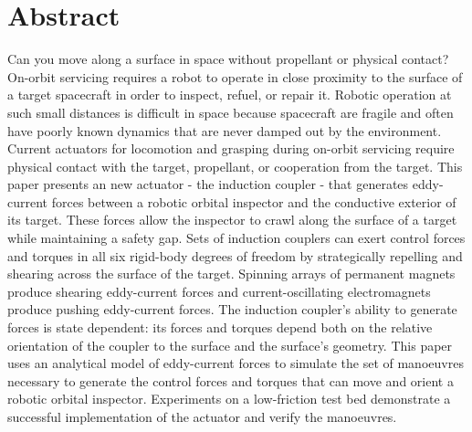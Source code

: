 \documentclass[10pt]{article}
\begin{document}
\listoftodos
{}
\section{Abstract}
Can you move along a surface in space without propellant or physical contact? On-orbit servicing requires a robot to operate in close proximity to the surface of a target spacecraft in order to inspect, refuel, or repair it.  Robotic operation at such small distances is difficult in space because spacecraft are fragile and often have poorly known dynamics that are never damped out by the environment. Current actuators for locomotion and grasping during on-orbit servicing require physical contact with the target, propellant, or cooperation from the target.  
%
This paper presents an new actuator - the induction coupler - that generates eddy-current forces between a robotic orbital inspector and the conductive exterior of its target. These forces allow the inspector to crawl along the surface of a target while maintaining a safety gap. Sets of induction couplers can exert control forces and torques in all six rigid-body degrees of freedom by strategically repelling and shearing across the surface of the target. Spinning arrays of permanent magnets produce shearing eddy-current forces and current-oscillating electromagnets produce pushing eddy-current forces. 
%
The induction coupler's ability to generate forces is state dependent: its forces and torques depend both on the relative orientation of the coupler to the surface and the surface's geometry. This paper uses an analytical model of eddy-current forces to simulate the set of manoeuvres necessary to generate the control forces and torques that can move and orient a robotic orbital inspector. Experiments on a low-friction test bed demonstrate a successful implementation of the actuator and verify the manoeuvres.       
\end{document}
